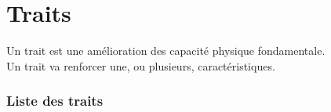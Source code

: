 \part{Traits}
Un trait est une amélioration des capacité physique fondamentale. \\
Un trait va renforcer une, ou plusieurs, caractéristiques.


\section{Liste des traits}